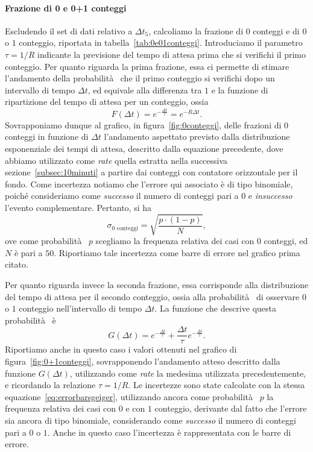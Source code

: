\documentclass[10pt,oneside,a4paper]{article}
\begin{document}
\paragraph{Frazione di 0 e 0+1 conteggi} 
Escludendo il set di dati relativo a $\Delta t_5$, calcoliamo la frazione di $0$ conteggi e di $0$ o $1$ conteggio, riportata in tabella~\ref{tab:0e01conteggi}. Introduciamo il parametro $\tau = 1/R$ indicante la previsione del tempo di attesa prima che si verifichi il primo conteggio. Per quanto riguarda la prima frazione, essa ci permette di stimare l'andamento della probabilità  che il primo conteggio si verifichi dopo un intervallo di tempo $\Delta t$, ed equivale alla differenza tra $1$ e la funzione di ripartizione del tempo di attesa per un conteggio, ossia
\[
F(\Delta t) = e^{-\frac{\Delta t}{\tau}} = e^{-R\Delta t}.
\]
Sovrapponiamo dunque al grafico, in figura~\ref{fig:0conteggi}, delle frazioni di $0$ conteggi in funzione di $\Delta t$ l'andamento aspettato previsto dalla distribuzione esponenziale dei tempi di attesa, descritto dalla equazione precedente, dove abbiamo utilizzato come \emph{rate} quella estratta nella successiva sezione~\ref{subsec:10minuti} a partire dai conteggi con contatore orizzontale per il fondo. Come incertezza notiamo che l'errore qui associato è di tipo binomiale, poiché consideriamo come \emph{successo} il numero di conteggi pari a $0$ e \emph{insuccesso} l'evento complementare. Pertanto, si ha
\begin{equation}\label{eq:errorbarsgeiger}
\sigma_{\text{$0$ conteggi}} = \sqrt{\frac{p\cdot(1-p)}{N}},
\end{equation}
ove come probabilità  $p$ scegliamo la frequenza relativa dei casi con $0$ conteggi, ed $N$ è pari a $50$. Riportiamo tale incertezza come barre di errore nel grafico prima citato.

Per quanto riguarda invece la seconda frazione, essa corrisponde alla distribuzione del tempo di attesa per il secondo conteggio, ossia alla probabilità  di osservare $0$ o $1$ conteggio nell'intervallo di tempo $\Delta t$. La funzione che descrive questa probabilità  è
\[
G(\Delta t) = e^{-\frac{\Delta t}{\tau}} + \frac{\Delta t}{\tau} e^{-\frac{\Delta t}{\tau}}.
\]
Riportiamo anche in questo caso i valori ottenuti nel grafico di figura~\ref{fig:0+1conteggi}, sovrapponendo l'andamento atteso descritto dalla funzione $G(\Delta t)$, utilizzando come \emph{rate} la medesima utilizzata precedentemente, e ricordando la relazione $\tau = 1 / R$. Le incertezze sono state calcolate con la stessa equazione~\ref{eq:errorbarsgeiger}, utilizzando ancora come probabilità  $p$ la frequenza relativa dei casi con $0$ e con $1$ conteggio, derivante dal fatto che l'errore sia ancora di tipo binomiale, considerando come \emph{successo} il numero di conteggi pari a $0$ o $1$. Anche in questo caso l'incertezza è rappresentata con le barre di errore.
\end{document}
